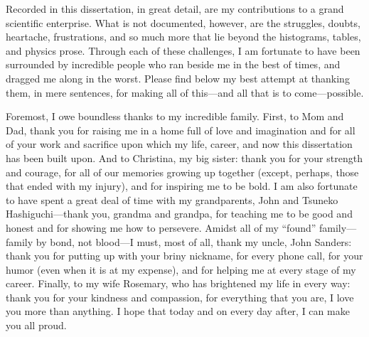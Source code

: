 \begin{acknowledgements}
Recorded in this dissertation, in great detail, are my contributions to a grand scientific enterprise. 
What is not documented, however, are the struggles, doubts, heartache, frustrations, and so much more that lie beyond the histograms, tables, and physics prose. 
Through each of these challenges, I am fortunate to have been surrounded by incredible people who ran beside me in the best of times, and dragged me along in the worst. 
Please find below my best attempt at thanking them, in mere sentences, for making all of this---and all that is to come---possible. 

Foremost, I owe boundless thanks to my incredible family. 
First, to Mom and Dad, thank you for raising me in a home full of love and imagination and for all of your work and sacrifice upon which my life, career, and now this dissertation has been built upon. 
And to Christina, my big sister: thank you for your strength and courage, for all of our memories growing up together (except, perhaps, those that ended with my injury), and for inspiring me to be bold. 
I am also fortunate to have spent a great deal of time with my grandparents, John and Tsuneko Hashiguchi---thank you, grandma and grandpa, for teaching me to be good and honest and for showing me how to persevere. 
Amidst all of my ``found'' family---family by bond, not blood---I must, most of all, thank my uncle, John Sanders: thank you for putting up with your briny nickname, for every phone call, for your humor (even when it is at my expense), and for helping me at every stage of my career. 
Finally, to my wife Rosemary, who has brightened my life in every way: thank you for your kindness and compassion, for everything that you are, I love you more than anything. 
I hope that today and on every day after, I can make you all proud.


\end{acknowledgements}
